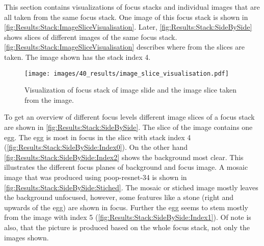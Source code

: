 This section contains visualizations of focus stacks and individual images that are all taken from the same focus stack. One image of this focus stack is shown in \autoref{fig:Results:Stack:ImageSliceVisualisation}. Later, \autoref{fig:Results:Stack:SideBySide} shows slices of different images of the same focus stack. \autoref{fig:Results:Stack:ImageSliceVisualisation} describes where from the slices are taken. The image shown has the stack index 4.

\begin{figure}
    \centering
    \texttt{[image: images/40\_results/image\_slice\_visualisation.pdf]}
    \caption{Visualization of focus stack of image slide and the image slice taken from the image.}
    \label{fig:Results:Stack:ImageSliceVisualisation}
\end{figure}


To get an overview of different focus levels different image slices of a focus stack are shown in \autoref{fig:Results:Stack:SideBySide}. The slice of the image contains one egg. The egg is most in focus in the slice with stack index 4 (\autoref{fig:Results:Stack:SideBySide:Index0}). On the other hand \autoref{fig:Results:Stack:SideBySide:Index2} shows the background most clear. This illustrates the different focus planes of background and focus image. A mosaic image that was produced using \acs{poop}-\acs{resnet}-34 is shown in \autoref{fig:Results:Stack:SideBySide:Stiched}. The mosaic or stiched image mostly leaves the background unfocused, however, some features like a stone (right and upwards of the egg) are shown in focus. Further the egg seems to stem mostly from the image with index 5 (\autoref{fig:Results:Stack:SideBySide:Index1}). Of note is also, that the picture is produced based on the whole focus stack, not only the images shown.


